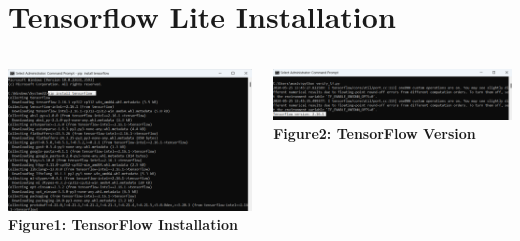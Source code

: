 \section{Tensorflow Lite Installation}
{
	\begin{columns}
		\centering
		\includegraphics[width=\textwidth]{images/TensorFlowInstallation}
		\vspace{0.2cm}
		\textbf{Figure1: TensorFlow Installation}
		
		\centering
		\includegraphics[width=\textwidth]{images/TensorFlowVersion}
		\vspace{0.2cm}
		\textbf{Figure2: TensorFlow Version} 
		
	\end{columns}
}

